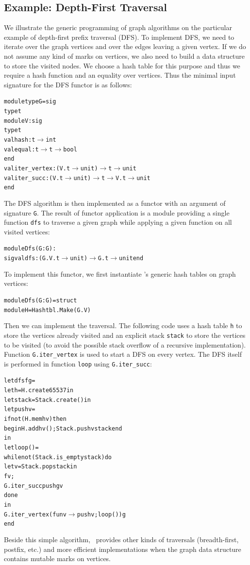 \subsection{Example: Depth-First Traversal}
\label{XII:dfs}

We illustrate the generic programming of graph algorithms on the
particular example of depth-first prefix traversal (DFS).  To implement DFS,
we need to iterate over the graph vertices and over the edges leaving
a given vertex. If we do not assume any kind of marks on vertices, we
also need to build a data structure to store the visited nodes. 
We choose a hash table for this purpose and thus we require a hash
function and an equality over vertices.
Thus the minimal input signature for the DFS functor is as follows:
\begin{alltt}
module type G = sig
  type t
  module V : sig
    type t 
    val hash : t \ensuremath{\rightarrow} int 
    val equal : t \ensuremath{\rightarrow} t \ensuremath{\rightarrow} bool 
  end
  val iter_vertex : (V.t \ensuremath{\rightarrow} unit) \ensuremath{\rightarrow} t \ensuremath{\rightarrow} unit
  val iter_succ : (V.t \ensuremath{\rightarrow} unit) \ensuremath{\rightarrow} t \ensuremath{\rightarrow} V.t \ensuremath{\rightarrow} unit
end
\end{alltt}
The DFS algorithm is then implemented as a functor with an argument of
signature \texttt{G}. The result of functor application is a module
providing a single function \texttt{dfs} to traverse a given graph
while applying a given function on all visited vertices:
\begin{alltt}
module Dfs(G : G) : 
  sig val dfs : (G.V.t \ensuremath{\rightarrow} unit) \ensuremath{\rightarrow} G.t \ensuremath{\rightarrow} unit end
\end{alltt}
To implement this functor, we first instantiate \ocaml's generic hash
tables on graph vertices:
\begin{alltt}
module Dfs(G : G) = struct
  module H = Hashtbl.Make(G.V)
\end{alltt}
Then we can implement the traversal. The following code uses a hash
table \texttt{h} to store the vertices already visited and an explicit
stack \texttt{stack} to store the vertices to be visited (to avoid the
possible stack overflow of a recursive implementation). Function
\texttt{G.iter\_vertex} is used to start a DFS on every vertex. The
DFS itself is performed in function \texttt{loop} using \texttt{G.iter\_succ}:
\begin{alltt}
  let dfs f g = 
    let h = H.create 65537 in
    let stack = Stack.create () in
    let push v = 
      if not (H.mem h v) then 
      begin H.add h v (); Stack.push v stack end
    in
    let loop () =
      while not (Stack.is_empty stack) do
        let v = Stack.pop stack in
        f v;
        G.iter_succ push g v
      done
    in
    G.iter_vertex (fun v \ensuremath{\rightarrow} push v; loop ()) g
end
\end{alltt}
Beside this simple algorithm, \ocamlgraph\ provides other kinds of
traversals (breadth-first, postfix, etc.) and more efficient
implementations when the graph data structure contains mutable marks
on vertices.

